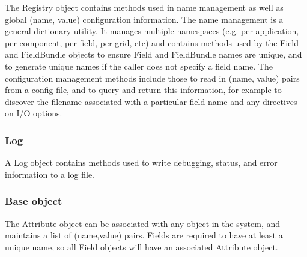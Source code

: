 The Registry object contains methods used in name management
as well as global (name, value) configuration information.
The name management is a general dictionary utility.  It
manages multiple namespaces (e.g. per application, per component,
per field, per grid, etc) and contains methods used by the
Field and FieldBundle objects to ensure Field and FieldBundle names
are unique, and to generate unique names if the caller does
not specify a field name.
The configuration management methods include those to 
read in (name, value) pairs from a config file, and to query
and return this information, for example to discover the
filename associated with a particular field name and
any directives on I/O options.


\subsubsection{Log}

A Log object contains methods used to write debugging, status,
and error information to a log file.

\subsubsection{Base object}

The Attribute object can be associated with any object in the system,
and maintains a list of (name,value) pairs.  Fields are required to
have at least a unique name, so all Field objects will have an associated
Attribute object.

